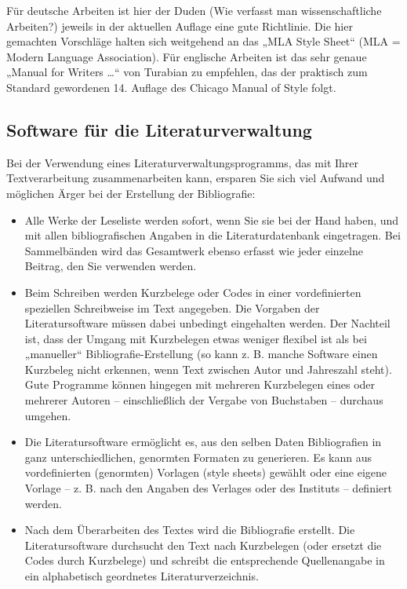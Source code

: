 \documentclass[]{book}
\providecommand{\tightlist}{%
  \setlength{\itemsep}{0pt}\setlength{\parskip}{0pt}}
\theoremstyle{definition}
\theoremstyle{definition}
\theoremstyle{definition}
\theoremstyle{remark}
\begin{document}
Für deutsche Arbeiten ist hier der Duden (Wie verfasst man
wissenschaftliche Arbeiten?) jeweils in der aktuellen Auflage eine gute
Richtlinie. Die hier gemachten Vorschläge halten sich weitgehend an das
„MLA Style Sheet`` (MLA = Modern Language Association). Für englische
Arbeiten ist das sehr genaue „Manual for Writers \ldots{}`` von Turabian
zu empfehlen, das der praktisch zum Standard gewordenen 14. Auflage des
Chicago Manual of Style folgt.

\subsection{Software für die
Literaturverwaltung}\label{software-fur-die-literaturverwaltung}

Bei der Verwendung eines Literaturverwaltungsprogramms, das mit Ihrer
Textverarbeitung zusammenarbeiten kann, ersparen Sie sich viel Aufwand
und möglichen Ärger bei der Erstellung der Bibliografie:

\begin{itemize}
\tightlist
\item
  Alle Werke der Leseliste werden sofort, wenn Sie sie bei der Hand
  haben, und mit allen bibliografischen Angaben in die
  Literaturdatenbank eingetragen. Bei Sammelbänden wird das Gesamtwerk
  ebenso erfasst wie jeder einzelne Beitrag, den Sie verwenden werden.
\item
  Beim Schreiben werden Kurzbelege oder Codes in einer vordefinierten
  speziellen Schreibweise im Text angegeben. Die Vorgaben der
  Literatursoftware müssen dabei unbedingt eingehalten werden. Der
  Nachteil ist, dass der Umgang mit Kurzbelegen etwas weniger flexibel
  ist als bei „manueller`` Bibliografie-Erstellung (so kann z. B. manche
  Software einen Kurzbeleg nicht erkennen, wenn Text zwischen Autor und
  Jahreszahl steht). Gute Programme können hingegen mit mehreren
  Kurzbelegen eines oder mehrerer Autoren -- einschließlich der Vergabe
  von Buchstaben -- durchaus umgehen.
\item
  Die Literatursoftware ermöglicht es, aus den selben Daten
  Bibliografien in ganz unterschiedlichen, genormten Formaten zu
  generieren. Es kann aus vordefinierten (genormten) Vorlagen (style
  sheets) gewählt oder eine eigene Vorlage -- z. B. nach den Angaben des
  Verlages oder des Instituts -- definiert werden.
\item
  Nach dem Überarbeiten des Textes wird die Bibliografie erstellt. Die
  Literatursoftware durchsucht den Text nach Kurzbelegen (oder ersetzt
  die Codes durch Kurzbelege) und schreibt die entsprechende
  Quellenangabe in ein alphabetisch geordnetes Literaturverzeichnis.
\end{itemize}
\end{document}
